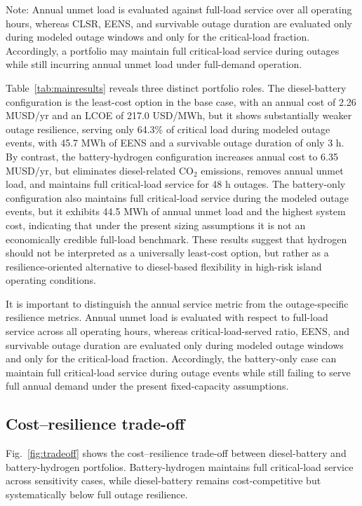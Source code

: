 \documentclass[preprint,12pt]{elsarticle}
\begin{document}
Note: Annual unmet load is evaluated against full-load service over all operating hours, whereas CLSR, EENS, and survivable outage duration are evaluated only during modeled outage windows and only for the critical-load fraction. Accordingly, a portfolio may maintain full critical-load service during outages while still incurring annual unmet load under full-demand operation.


Table~\ref{tab:mainresults} reveals three distinct portfolio roles. The diesel-battery configuration is the least-cost option in the base case, with an annual cost of 2.26 MUSD/yr and an LCOE of 217.0 USD/MWh, but it shows substantially weaker outage resilience, serving only 64.3\% of critical load during modeled outage events, with 45.7 MWh of EENS and a survivable outage duration of only 3 h. By contrast, the battery-hydrogen configuration increases annual cost to 6.35 MUSD/yr, but eliminates diesel-related CO$_2$ emissions, removes annual unmet load, and maintains full critical-load service for 48 h outages. The battery-only configuration also maintains full critical-load service during the modeled outage events, but it exhibits 44.5 MWh of annual unmet load and the highest system cost, indicating that under the present sizing assumptions it is not an economically credible full-load benchmark. These results suggest that hydrogen should not be interpreted as a universally least-cost option, but rather as a resilience-oriented alternative to diesel-based flexibility in high-risk island operating conditions.

It is important to distinguish the annual service metric from the outage-specific resilience metrics. Annual unmet load is evaluated with respect to full-load service across all operating hours, whereas critical-load-served ratio, EENS, and survivable outage duration are evaluated only during modeled outage windows and only for the critical-load fraction. Accordingly, the battery-only case can maintain full critical-load service during outage events while still failing to serve full annual demand under the present fixed-capacity assumptions.

\subsection{Cost--resilience trade-off}
Fig.~\ref{fig:tradeoff} shows the cost--resilience trade-off between diesel-battery and battery-hydrogen portfolios. Battery-hydrogen maintains full critical-load service across sensitivity cases, while diesel-battery remains cost-competitive but systematically below full outage resilience.
\end{document}
